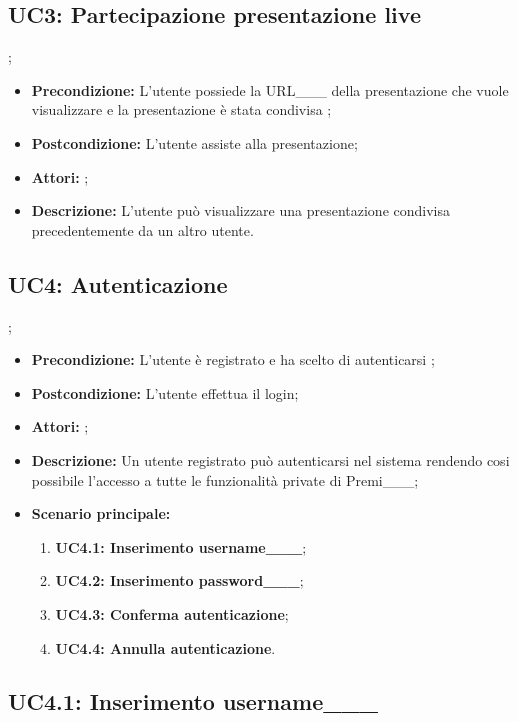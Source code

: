 \subsection{ UC3: Partecipazione presentazione live}
;
\begin{itemize}
	\item \textbf{Precondizione:} L'utente possiede la URL___ della presentazione che vuole visualizzare e la presentazione è stata condivisa ;
	\item \textbf{Postcondizione:} L'utente assiste alla presentazione;
	\item \textbf{Attori:} ;
	\item \textbf{Descrizione:} L'utente può visualizzare una presentazione condivisa precedentemente da un altro utente.
\end{itemize}
\subsection{ UC4: Autenticazione}
;
\begin{itemize}
	\item \textbf{Precondizione:} L'utente è registrato e ha scelto di autenticarsi ;
	\item \textbf{Postcondizione:} L'utente effettua il login;
	\item \textbf{Attori:} ;
	\item \textbf{Descrizione:} Un utente registrato può autenticarsi nel sistema rendendo cosi possibile l'accesso a tutte le funzionalità private di Premi___;
	\item \textbf{Scenario principale:}
	\begin{enumerate}
		\item \textbf{ UC4.1: Inserimento username___};
		\item \textbf{ UC4.2: Inserimento password___};
		\item \textbf{ UC4.3: Conferma autenticazione};
		\item \textbf{ UC4.4: Annulla autenticazione}.
	\end{enumerate}
\end{itemize}
\subsection{ UC4.1: Inserimento username___}

